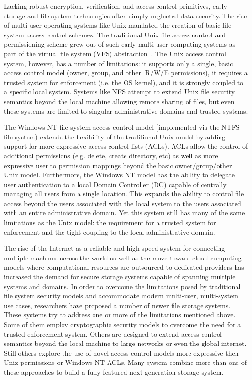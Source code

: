Lacking robust encryption, verification, and access control
primitives, early storage and file system technologies often simply
neglected data security. The rise of multi-user operating systems like
Unix mandated the creation of basic file-system access control
schemes. The traditional Unix file access control and permissioning
scheme grew out of such early multi-user computing systems as part of
the virtual file system (VFS) abstraction~\cite{linux-vfs}. The Unix
access control system, however, has a number of limitations: it
supports only a single, basic access control model (owner, group, and
other; R/W/E permissions), it requires a trusted system for
enforcement (i.e. the OS kernel), and it is strongly coupled to a
specific local system. Systems like NFS attempt to extend Unix file
security semantics beyond the local machine allowing remote sharing of
files, but even these systems are limited to singular administrative
domains and trusted systems.

The Windows NT file system access control model (implemented via the
NTFS file system) extends the flexibility of the traditional Unix
model by adding support for more expressive access control lists
(ACLs). ACLs allow the control of additional permissions (e.g. delete,
create directory, etc) as well as more expressive user to permission
mappings beyond the basic owner/group/other Unix model. Furthermore,
the Windows NT model has the ability to delegate user authentication
to a local Domain Controller (DC) capable of centrally managing all
users from a single location. This expands the ability to control file
access beyond the users associated with the local system to the users
associated with an entire administrative domain. Yet this system still
has many of the same limitations as the Unix model: the requirement
for a trusted system for enforcement and the tight coupling to the
local administrative domain.

The rise of the Internet as a reliable and high speed system for
connecting multiple machines across the world as well as the move
toward cloud computing models where computational resources are
outsourced to dedicated providers has increased the demand for secure
storage systems capable of spanning multiple systems and domains. In
order to overcome the limitations posed by traditional file system
security models and accommodate modern multi-user, multi-system use
cases, researchers have proposed a number of newer file storage
systems. These systems try to address one or more of the limitations
mentioned above. Some of them employ cryptographic security models to
overcome the need for a trusted enforcement system. Others are
designed to extend access control semantics beyond the local machine
to large networks or even the global internet. Still others explore
the use of novel access control models more expressive then Unix
permissions or Windows NT ACLs. Many system combine more than one of
these approaches to build a fully featured next-generation storage
system.

